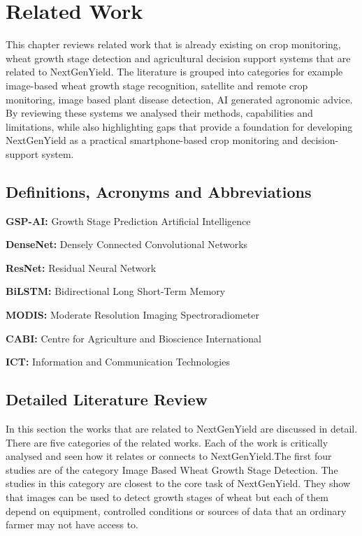 \documentclass{FastFyp}
\begin{document}
 

\chapter{Related Work}
This chapter reviews related work that is already existing on crop monitoring, wheat growth stage detection and agricultural decision support systems that are related to NextGenYield. The literature is grouped into categories for example image-based wheat growth stage recognition, satellite and remote crop monitoring, image based plant disease detection, AI generated agronomic advice. By reviewing these systems we analysed their methods, capabilities and limitations, while also highlighting gaps that provide a foundation for developing NextGenYield as a practical smartphone-based crop monitoring and decision-support system. 
\section{Definitions, Acronyms and Abbreviations}

\textbf{GSP-AI:} Growth Stage Prediction Artificial Intelligence

\textbf{DenseNet:} Densely Connected Convolutional Networks

\textbf{ResNet:} Residual Neural Network

\textbf{BiLSTM:} Bidirectional Long Short-Term Memory

\textbf{MODIS:} Moderate Resolution Imaging Spectroradiometer

\textbf{CABI:} Centre for Agriculture and Bioscience International

\textbf{ICT:} Information and Communication Technologies

 
\section{Detailed Literature Review} 
In this section the works that are related to NextGenYield are discussed in detail. There are five categories of the related works. Each of the work is critically analysed and seen how it relates or connects to NextGenYield.The first four studies are of the category Image Based Wheat Growth Stage Detection. The studies in this category are closest to the core task of NextGenYield. They show that images can be used to detect growth stages of wheat but each of them depend on equipment, controlled conditions or sources of data that an ordinary farmer may not have access to.
\end{document}
